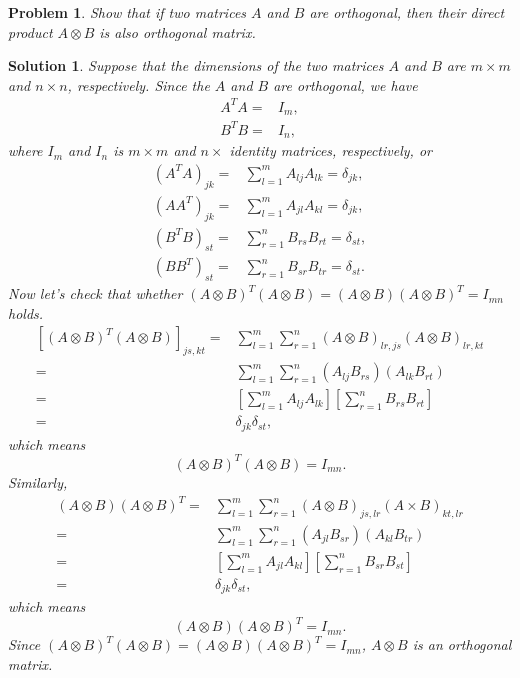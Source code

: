 \documentclass[UTF8,10pt,a4paper]{article}
\theoremstyle{Problem}
\newtheorem{prob}{Problem}
\theoremstyle{Solution}
\newtheorem*{sol}{Solution}
\begin{document}
\begin{prob}
    Show that if two matrices $A$ and $B$ are orthogonal, then their direct product $A\otimes B$ is also orthogonal matrix.
\end{prob}
\begin{sol}
    Suppose that the dimensions of the two matrices $A$ and $B$ are $m\times m$ and $n\times n$, respectively. Since the $A$ and $B$ are orthogonal, we have
    \begin{align}
        A^TA=&I_m,\\
        B^TB=&I_n,
    \end{align}
    where $I_m$ and $I_n$ is $m\times m$ and $n\times$ identity matrices, respectively, or
    \begin{align}
        (A^TA)_{jk}=&\sum_{l=1}^mA_{lj}A_{lk}=\delta_{jk},\\
        (AA^T)_{jk}=&\sum_{l=1}^mA_{jl}A_{kl}=\delta_{jk},\\
        (B^TB)_{st}=&\sum_{r=1}^nB_{rs}B_{rt}=\delta_{st},\\
        (BB^T)_{st}=&\sum_{r=1}^nB_{sr}B_{tr}=\delta_{st}.
    \end{align}
    Now let's check that whether $(A\otimes B)^T(A\otimes B)=(A\otimes B)(A\otimes B)^T=I_{mn}$ holds.
    \begin{align}
        \nonumber[(A\otimes B)^T(A\otimes B)]_{js,kt}=&\sum_{l=1}^m\sum_{r=1}^n(A\otimes B)_{lr,js}(A\otimes B)_{lr,kt}\\
        \nonumber=&\sum_{l=1}^m\sum_{r=1}^n(A_{lj}B_{rs})(A_{lk}B_{rt})\\
        \nonumber=&\left[\sum_{l=1}^mA_{lj}A_{lk}\right]\left[\sum_{r=1}^nB_{rs}B_{rt}\right]\\
        =&\delta_{jk}\delta_{st},
    \end{align}
    which means
    \begin{equation}
        (A\otimes B)^T(A\otimes B)=I_{mn}.
    \end{equation}
    Similarly,
    \begin{align}
        \nonumber(A\otimes B)(A\otimes B)^T=&\sum_{l=1}^m\sum_{r=1}^n(A\otimes B)_{js,lr}(A\times B)_{kt,lr}\\
        \nonumber=&\sum_{l=1}^m\sum_{r=1}^n(A_{jl}B_{sr})(A_{kl}B_{tr})\\
        \nonumber=&\left[\sum_{l=1}^mA_{jl}A_{kl}\right]\left[\sum_{r=1}^nB_{sr}B_{st}\right]\\
        =&\delta_{jk}\delta_{st},
    \end{align}
    which means
    \begin{equation}
        (A\otimes B)(A\otimes B)^T=I_{mn}.
    \end{equation}
    Since $(A\otimes B)^T(A\otimes B)=(A\otimes B)(A\otimes B)^T=I_{mn}$, $A\otimes B$ is an orthogonal matrix.
\end{sol}
\end{document}
